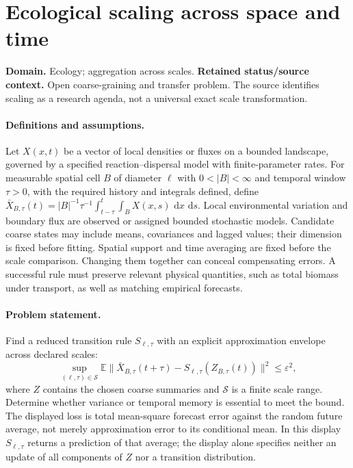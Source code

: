 \documentclass[11pt]{article}
\begin{document}
\section*{Ecological scaling across space and time}
\label{prob:181}
\label{rank:166}
\par\smallskip

\noindent\textbf{Domain.} Ecology; aggregation across scales. \quad \textbf{Retained status/source context.} Open coarse-graining and transfer problem. The source identifies scaling as a research agenda, not a universal exact scale transformation.
\paragraph{Definitions and assumptions.} Let $X(x,t)$ be a vector of local densities or fluxes on a bounded landscape, governed by a specified reaction--dispersal model with finite-parameter rates. For measurable spatial cell $B$ of diameter $\ell$ with $0<|B|<\infty$ and temporal window $\tau>0$, with the required history and integrals defined, define $\bar X_{B,\tau}(t)=|B|^{-1}\tau^{-1}\int_{t-\tau}^{t}\int_BX(x,s)\,\,\mathrm{d} x\,\,\mathrm{d} s$. Local environmental variation and boundary flux are observed or assigned bounded stochastic models. Candidate coarse states may include means, covariances and lagged values; their dimension is fixed before fitting. Spatial support and time averaging are fixed before the scale comparison. Changing them together can conceal compensating errors. A successful rule must preserve relevant physical quantities, such as total biomass under transport, as well as matching empirical forecasts.
\paragraph{Problem statement.} Find a reduced transition rule $S_{\ell,\tau}$ with an explicit approximation envelope across declared scales:
\[
 \sup_{(\ell,\tau)\in\mathcal S}
 \mathbb{E}\|\bar X_{B,\tau}(t+\tau)
       -S_{\ell,\tau}(Z_{B,\tau}(t))\|^2\le\varepsilon^2,
\]
where $Z$ contains the chosen coarse summaries and $\mathcal S$ is a finite scale range. Determine whether variance or temporal memory is essential to meet the bound. The displayed loss is total mean-square forecast error against the random future average, not merely approximation error to its conditional mean. In this display $S_{\ell,\tau}$ returns a prediction of that average; the display alone specifies neither an update of all components of $Z$ nor a transition distribution.
\end{document}
